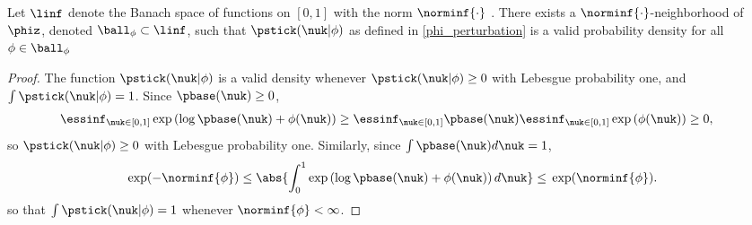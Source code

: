 \begin{prop}
%
Let $\linf$ denote the Banach space of functions on $[0,1]$ with the norm
$\norminf{\cdot}$ \citep[Theorem 5.2.1]{dudley:2018:real}.
There exists a $\norminf{\cdot}$-neighborhood of $\phiz$, denoted $\ball_\phi
\subset \linf$, such that $\pstick(\nuk \vert \phi)$ as defined in
\eqref{phi_perturbation} is a valid probability density for all $\phi \in
\ball_\phi$
%
\begin{proof}
%
The function $\pstick(\nuk \vert \phi)$ is a valid density whenever
$\pstick(\nuk \vert \phi) \ge 0$ with Lebesgue probability one, and $\int
\pstick(\nuk \vert \phi) = 1$. Since $\pbase(\nuk) \ge 0$,
%
\begin{align*}
%
\essinf_{\nuk \in [0,1]} \exp\left(\log \pbase(\nuk) + \phi(\nuk)\right)
    \ge{}&
\essinf_{\nuk \in [0,1]} \pbase(\nuk)
\essinf_{\nuk \in [0,1]} \exp\left(\phi(\nuk)\right)
\ge{}0,
%
\end{align*}
%
so $\pstick(\nuk \vert \phi) \ge 0$ with Lebesgue probability one. Similarly,
since $\int \pbase(\nuk) d\nuk = 1$,
%
\begin{align*}
%
\exp(-\norminf{\phi}) \le{}
\abs{\int_0^1 \exp\left(\log \pbase(\nuk) + \phi(\nuk)\right) d\nuk}
\le{}
\exp(\norminf{\phi}).
%
\end{align*}
%
so that $\int \pstick(\nuk \vert \phi) = 1$ whenever $\norminf{\phi} < \infty$.
%
\end{proof}
%
\end{prop}
